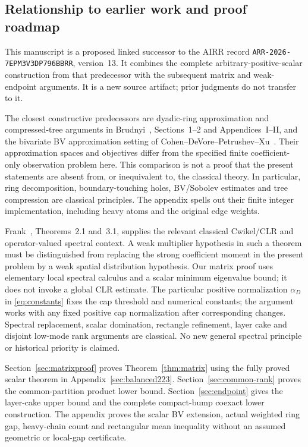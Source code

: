 \documentclass[11pt]{article}
\begin{document}
\subsection{Relationship to earlier work and proof roadmap}
This manuscript is a proposed linked successor to the AIRR record
\texttt{ARR-2026-7EPM3V3DP796BBRR}, version~13.
It combines the complete arbitrary-positive-scalar construction from that
predecessor with the subsequent matrix and weak-endpoint arguments. It is a
new source artifact; prior judgments do not transfer to it.

The closest constructive predecessors are dyadic-ring approximation and
compressed-tree arguments in Brudnyi~\cite{brudnyi221}, Sections~1--2 and
Appendices~I--II, and the bivariate BV approximation setting of
Cohen--DeVore--Petrushev--Xu~\cite{cdpx223}. Their approximation spaces and
objectives differ from the specified finite coefficient-only observation
problem here. This comparison is not a proof that the present statements
are absent from, or inequivalent to, the classical theory. In particular,
ring decomposition, boundary-touching holes, BV/Sobolev estimates and tree
compression are classical principles. The appendix spells out their finite
integer implementation, including heavy atoms and the original edge weights.

Frank~\cite{frank}, Theorems~2.1 and~3.1, supplies the relevant classical
Cwikel/CLR and operator-valued spectral context. A weak multiplier hypothesis
in such a theorem must be distinguished from replacing the strong coefficient
moment in the present problem by a weak spatial distribution hypothesis.
Our matrix proof uses elementary local spectral calculus and a scalar minimum
eigenvalue bound; it does not invoke a global CLR estimate. The particular
positive normalization $\alpha_D$ in \eqref{eq:constants} fixes the cap
threshold and numerical constants; the argument works with any fixed positive
cap normalization after corresponding changes. Spectral replacement,
scalar domination, rectangle refinement, layer cake and disjoint low-mode
rank arguments are classical. No new general spectral principle or
historical priority is claimed.

Section~\ref{sec:matrixproof} proves Theorem~\ref{thm:matrix} using the
fully proved scalar theorem in Appendix~\ref{sec:balanced223}.
Section~\ref{sec:common-rank} proves the common-partition product lower bound.
Section~\ref{sec:endpoint} gives the layer-cake upper bound and the complete
compact-bump coexact lower construction. The appendix proves the scalar
BV extension, actual weighted ring gap, heavy-chain count and rectangular
mean inequality without an assumed geometric or local-gap certificate.
\end{document}
